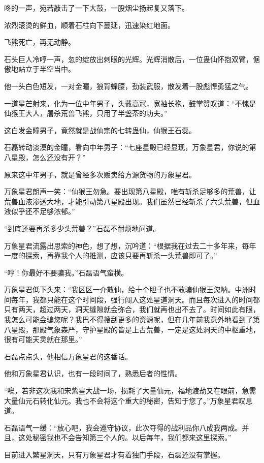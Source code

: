 \begin{this_body}
咚的一声，宛若敲击了一下大鼓，一股烟尘扬起复又落下。

浓烈滚烫的鲜血，顺着石柱向下蔓延，迅速染红地面。

飞熊死亡，再无动静。

石头巨人冷哼一声，忽的绽放出刺眼的光辉。光辉消散后，一位蛊仙怀抱双臂，倨傲地站立于半空当中。

他一头白色短发，一对金瞳，狼背蜂腰，劲装武服，散发着一股彪悍勇猛之气。

一道星芒射来，化为一位中年男子，头戴高冠，宽袖长袍，鼓掌赞叹道：“不愧是仙猴王大人，屠杀荒兽飞熊，只用了半盏茶的功夫。”

这白发金瞳男子，竟然就是战仙宗的七转蛊仙，仙猴王石磊。

石磊转动淡漠的金瞳，看向中年男子：“七座星殿已经显现，万象星君，你说的第八星殿，怎么还没有开？”

原来这中年男子，就是曾经多次贩卖给方源货物的万象星君。

万象星君朗声一笑：“仙猴王勿急。要出现第八星殿，唯有斩杀足够多的荒兽，让荒兽血液渗透大地，才能引动第八星殿出现。我们虽然已经斩杀了六头荒兽，但血液似乎还不足够浓郁。”

“到底还要再杀多少头荒兽？”石磊不耐烦地问道。

万象星君流露出思索的神色，想了想，沉吟道：“根据我在过去二十多年来，每年一度的探索，再靠我个人的推测，应该只要再斩杀一头荒兽即可了。”

“哼！你最好不要骗我。”石磊语气蛮横。

万象星君低下头来：“我区区一介散仙，给十个胆子也不敢骗仙猴王您呐。中洲时间每年，我都只能在这个时间段，强行闯入这处星道洞天。而且每次进入的时间都只有两天，超过两天，洞天缝隙就会弥合，我们就再也出不去了。时间如此有限，我怎么可能会骗您呢？我巴不得搜刮更多的资源呢，但在几年前我意外地看到了第八星殿，那殿气象森严，守护星殿的皆是上古荒兽，一定是这处洞天的中枢重地，很有可能天灵就在那里。”

石磊点点头，他相信万象星君的这番话。

他和万象星君认识，也有一段时间了，熟悉后者的性情。

“唉，若非这次我和宋紫星大战一场，损耗了大量仙元，福地渡劫又在眼前，急需大量仙元石转化仙元。我也不会将这个重大的秘密，告知于您了。”万象星君叹息道。

石磊语气一缓：“放心吧，我会遵守协议，此次夺得的战利品你八成我两成。并且，这处秘密我也不会告知第三个人的。以后每年，我们都来这里探索。”

目前进入繁星洞天，只有万象星君才有着独门手段，石磊还没有掌握。


\end{this_body}
